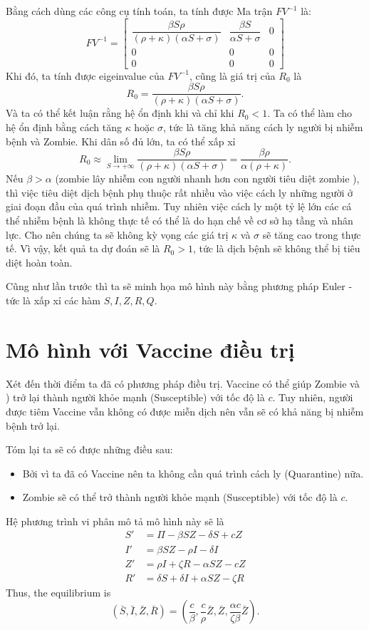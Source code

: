 \documentclass[12pt]{scrartcl}
\begin{document}
Bằng cách dùng các công cụ tính toán, ta tính được 
Ma trận \(FV^{-1}\) là:
\[
FV^{-1} =
\begin{bmatrix}
\dfrac{\beta S \rho}{(\rho+\kappa)(\alpha S+\sigma)} &
\dfrac{\beta S}{\alpha S+\sigma} &
0 \\[12pt]
0 & 0 & 0 \\[12pt]
0 & 0 & 0
\end{bmatrix}
\]
Khi đó, ta tính được eigeinvalue của $FV^{-1}$, cũng là giá trị của $R_0$ là 
\[
    R_0 = \frac{\beta S \rho}{(\rho+\kappa)(\alpha S+\sigma)}.
\]
Và ta có thể kết luận rằng hệ ổn định khi và chỉ khi $R_0 < 1$. Ta có thể làm cho hệ ổn định bằng cách tăng $\kappa$ hoặc $\sigma$, tức là tăng khả năng cách ly người bị nhiễm bệnh và Zombie. Khi dân số đủ lớn, ta có thể xấp xỉ 
\[
R_0 \approx \lim_{S \to +\infty} \frac{\beta S \rho}{(\rho+\kappa)(\alpha S+\sigma)} = \frac{\beta \rho}{\alpha(\rho+\kappa)}.
\]
Nếu $\beta > \alpha$ (zombie lây nhiễm con người nhanh hơn con người tiêu diệt zombie ), thì việc tiêu diệt dịch bệnh phụ thuộc rất nhiều vào việc cách ly những người ở giai đoạn đầu của quá trình nhiễm. Tuy nhiên việc cách ly một tỷ lệ lớn các cá thể nhiễm bệnh là không thực tế có thể là do hạn chế về cơ sở hạ tầng và nhân lực. Cho nên chúng ta sẽ không kỳ vọng các giá trị $\kappa$ và $\sigma$ sẽ tăng cao trong thực tế. Vì vậy, kết quả ta dự đoán sẽ là $R_0 > 1$, tức là dịch bệnh sẽ không thể bị tiêu diệt hoàn toàn.

Cũng như lần trước thì ta sẽ minh họa mô hình này bằng phương pháp Euler - tức là xấp xỉ các hàm $S, I, Z, R, Q$.

\section{Mô hình với Vaccine điều trị}
Xét đến thời điểm ta đã có phương pháp điều trị. Vaccine có thể giúp Zombie và ) trở lại thành người khỏe mạnh (Susceptible) với tốc độ là $c$. Tuy nhiên, người được tiêm Vaccine vẫn không có được miễn dịch nên vẫn sẽ có khả năng bị nhiễm bệnh trở lại. 


Tóm lại ta sẽ có được những điều sau:
\begin{itemize}
    \item Bởi vì ta đã có Vaccine nên ta không cần quá trình cách ly (Quarantine) nữa.
    \item Zombie sẽ có thể trở thành người khỏe mạnh (Susceptible) với tốc độ là $c$.
\end{itemize}
Hệ phương trình vi phân mô tả mô hình này sẽ là
\[
    \begin{aligned}
        S' &= \Pi - \beta S Z - \delta S + cZ \\
        I' &= \beta S Z - \rho I - \delta I \\
        Z' &= \rho I + \zeta R - \alpha S Z - cZ\\
        R' &= \delta S + \delta I + \alpha S Z - \zeta R 
    \end{aligned}
\]
Thus, the equilibrium is
\[
(\bar{S}, \bar{I}, \bar{Z}, \bar{R}) =
\left( \frac{c}{\beta}, \frac{c}{\rho} \bar{Z}, \bar{Z}, \frac{\alpha c}{\zeta \beta} \bar{Z} \right).
\]
\end{document}
